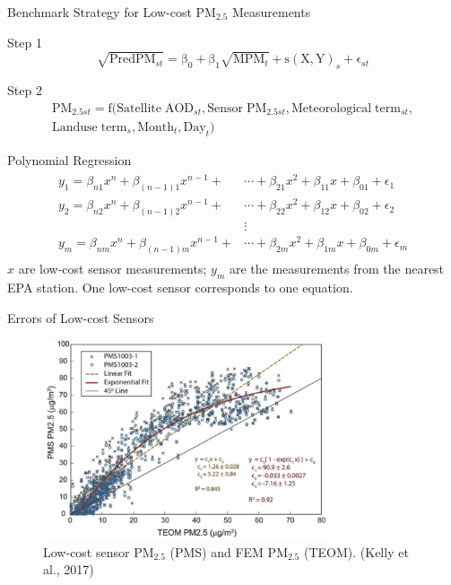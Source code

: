 \documentclass[handout]{beamer} %
\begin{document}
\begin{frame}{Benchmark Strategy for Low-cost PM$_{2.5}$ Measurements}
    \begin{block}{Step 1}
            \begin{equation*}
        \mathrm{\sqrt{PredPM_\mathit{st}}=\beta_0+\beta_1 \sqrt{MPM_\mathit{t}}+s(X,Y)_\mathit{s}+\epsilon_\mathit{st}}
    \end{equation*}
    \end{block}
    \begin{block}{Step 2}
        \begin{align*}
        \mathrm{PM_{2.5\mathit{st}}=f(Satellite\;AOD_{\mathit{st}},Sensor\;PM_{2.5\mathit{st}},Meteorological\;term_{\mathit{st}},}\\
        \mathrm{Landuse\;term_\mathit{s},Month_\mathit{t}, Day_\mathit{t})}
        \end{align*}
    \end{block}
\end{frame}

\begin{frame}{Polynomial Regression}
    \begin{align*}
        \begin{split}
        y_1=\beta_{n1}x^n+\beta_{(n-1)1}x^{n-1}+&\cdots+\beta_{21}x^2+\beta_{11}x+\beta_{01} + \epsilon_1 \\
        y_2=\beta_{n2}x^n+\beta_{(n-1)2}x^{n-1}+&\cdots+\beta_{22}x^2+\beta_{12}x+\beta_{02} + \epsilon_2 \\
        &\vdots \\
        y_m=\beta_{nm}x^n+\beta_{(n-1)m}x^{n-1}+&\cdots+\beta_{2m}x^2+\beta_{1m}x+\beta_{0m} + \epsilon_m
        \end{split}
    \end{align*}
    \textcolor[rgb]{0.1,0.1,0.6}{$x$ are low-cost sensor measurements; $y_m$ are the measurements from the nearest EPA station. One low-cost sensor corresponds to one equation.}
\end{frame}

\begin{frame}{Errors of Low-cost Sensors}
    \label{frm:error}
    \begin{figure}
        \centering
        \includegraphics[width=0.75\textwidth]{img/appendix/Aim2/kelly2017.png}
        \caption{Low-cost sensor PM$_{2.5}$ (PMS) and FEM PM$_{2.5}$ (TEOM). (Kelly et al., 2017)}
    \end{figure}
\end{frame}
\end{document}
